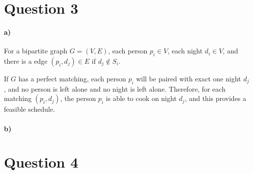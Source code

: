 \documentclass[letter,12pt]{article}
\begin{document}
\section*{Question 3}
\paragraph*{a)}
For a bipartite graph $G=(V,E)$, each person $p_i \in V$, each night $d_i \in 
 V$, and there is a edge $(p_i, d_j) \in E$ if $d_j \notin S_i$.
 
 If $G$ has a perfect matching, each person $p_i$ will be paired with exact one 
 night $d_j$, and no person is left alone and no night is left alone. Therefore, 
 for each matching $(p_i, d_j)$, the person $p_i$ is able to cook on night $d_j$,
 and this provides a feasible schedule.
 
 \paragraph*{b)}
 
\section*{Question 4}
\end{document}
